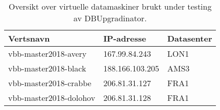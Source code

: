 \begin{table}[!h]
\begin{center}
    \begin{tabular}{ | l | l | l |}
      \hline
      \textbf{Vertsnavn} & \textbf{IP-adresse} & \textbf{Datasenter} \\ \hline
      vbb-master2018-avery & 167.99.84.243 & LON1 \\ \hline
      vbb-master2018-black & 188.166.103.205 & AMS3 \\ \hline
      vbb-master2018-crabbe & 206.81.31.127 & FRA1 \\ \hline
      vbb-master2018-dolohov & 206.81.31.128 & FRA1 \\ \hline
    \end{tabular}
\end{center}
\caption{Oversikt over virtuelle datamaskiner brukt under testing av DBUpgradinator.}
\label{droplets}
\end{table}
